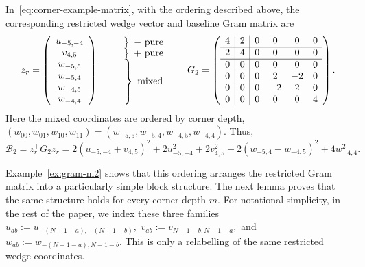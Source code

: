 \begin{example}[Gram representation for a corner-supported Toeplitz BW form with $m=2$]\label{ex:gram-m2}
In~\eqref{eq:corner-example-matrix}, with the ordering described above, the corresponding restricted wedge vector and baseline Gram matrix are
\[
z_r=
\left(
\begin{array}{c}
u_{-5,-4}\\
v_{4,5}\\
w_{-5,5}\\
w_{-5,4}\\
w_{-4,5}\\
w_{-4,4}
\end{array}
\right)
\qquad
\begin{array}{c}
\left.\vphantom{\begin{array}{c}u_{-5,-4}\end{array}}\right\}\ \text{$-$ pure}\\[-0.2ex]
\left.\vphantom{\begin{array}{c}v_{4,5}\end{array}}\right\}\ \text{$+$ pure}\\[-0.2ex]
\left.\vphantom{\begin{array}{c}w_{-5,5}\\ w_{-5,4}\\ w_{-4,5}\\ w_{-4,4}\end{array}}\right\}\ \text{mixed} \\[-0.2ex]
\end{array}
\qquad
G_2=
\left(
\begin{array}{c|c|cccc}
4&2&0&0&0&0\\ \hline
2&4&0&0&0&0\\ \hline
0&0&0&0&0&0\\
0&0&0&2&-2&0\\
0&0&0&-2&2&0\\
0&0&0&0&0&4
\end{array}
\right).
\]
Here the mixed coordinates are ordered by corner depth,
$
(w_{00},w_{01},w_{10},w_{11})
=
(w_{-5,5},w_{-5,4},w_{-4,5},w_{-4,4}).
$
Thus,
\[
\mathcal B_2=z_r^\top G_2z_r
=
2(u_{-5,-4}+v_{4,5})^2
+2u_{-5,-4}^2
+2v_{4,5}^2
+2(w_{-5,4}-w_{-4,5})^2
+4w_{-4,4}^2.
\]
\end{example}
Example~\ref{ex:gram-m2} shows that this ordering arranges the restricted Gram matrix into a particularly simple block structure. The next lemma proves that the same structure holds for every corner depth $m$. 
For notational simplicity, in the rest of the paper,  we index
these three families 
$
u_{ab}:=u_{-(N-1-a),-(N-1-b)},
$
$
v_{ab}:=v_{N-1-b,N-1-a},
$
and
$
w_{ab}:=w_{-(N-1-a),N-1-b}.
$
This is only a relabelling of the same restricted wedge coordinates.


